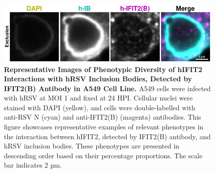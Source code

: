 \begin{figure}
    \centering
    \includegraphics[width=1\linewidth]{08. Chapter 3/Figs/02. Infection/02. IFIT2/02. IFIT2B/03. i2b-a549.pdf} 
    \caption[Representative Images of Phenotypic Diversity of hIFIT2 Interactions with hRSV Inclusion Bodies, Detected by IFIT2(B) Antibody in A549 Cell Line.]{\textbf{Representative Images of Phenotypic Diversity of hIFIT2 Interactions with hRSV Inclusion Bodies, Detected by IFIT2(B) Antibody in A549 Cell Line.} A549 cells were infected with hRSV at MOI 1 and fixed at 24 HPI. Cellular nuclei were stained with DAPI (yellow), and cells were double-labelled with anti-RSV N (cyan) and anti-IFIT2(B) (magenta) antibodies. This figure showcases representative examples of relevant phenotypes in the interaction between hIFIT2, detected by IFIT2(B) antibody, and hRSV inclusion bodies. These phenotypes are presented in descending order based on their percentage proportions. The scale bar indicates 2 µm.}
    \label{fig:Representative Images of Phenotypic Diversity of hIFIT2 Interactions with hRSV Inclusion Bodies, Detected by IFIT2(B) Antibody in A549 Cell Line}
\end{figure}

